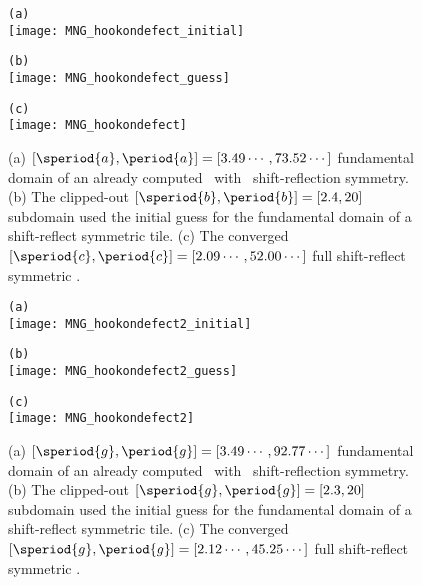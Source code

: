 \begin{figure}
\begin{minipage}[height=.4\textheight]{.5\textwidth}
\centering \small{\texttt{(a)}}\\
\texttt{[image: MNG\_hookondefect\_initial]}
\end{minipage}
\begin{minipage}[height=.4\textheight]{.5\textwidth}
\centering \small{\texttt{(b)}}\\
\texttt{[image: MNG\_hookondefect\_guess]}
\end{minipage}
\begin{minipage}[height=.4\textheight]{\textwidth}
\centering \small{\texttt{(c)}}\\
\texttt{[image: MNG\_hookondefect]}
\end{minipage}
\caption{ \label{fig:hookondefect}
(a)
$[\speriod{a},\period{a}]=[3.49\cdots,73.52\cdots]$ fundamental domain
of an already computed \twot\ with \spt\ shift-reflection symmetry.
(b)
The clipped-out $[\speriod{b},\period{b}]=[2.4,20]$ subdomain used the
initial guess for the fundamental domain of a shift-reflect symmetric tile.
(c)
The converged $[\speriod{c},\period{c}]=[2.09\cdots,52.00\cdots]$ full
shift-reflect symmetric \twot.
}
\end{figure}

\begin{figure}
\begin{minipage}[height=.4\textheight]{.5\textwidth}
\centering \small{\texttt{(a)}}\\
\texttt{[image: MNG\_hookondefect2\_initial]}
\end{minipage}
\begin{minipage}[height=.4\textheight]{.5\textwidth}
\centering \small{\texttt{(b)}}\\
\texttt{[image: MNG\_hookondefect2\_guess]}
\end{minipage}
\begin{minipage}[height=.1\textheight]{\textwidth}
\centering \small{\texttt{(c)}}\\
\texttt{[image: MNG\_hookondefect2]}
\end{minipage}
\caption{ \label{fig:hookondefect2}
(a)
$[\speriod{g},\period{g}]=[3.49\cdots,92.77\cdots]$ fundamental domain
of an already computed \twot\ with \spt\ shift-reflection symmetry.
(b)
The clipped-out $[\speriod{g},\period{g}]=[2.3,20]$ subdomain used the
initial guess for the fundamental domain of a shift-reflect symmetric tile.
(c)
The converged $[\speriod{g},\period{g}]=[2.12\cdots,45.25\cdots]$ full
shift-reflect symmetric \twot.
}
\end{figure}

